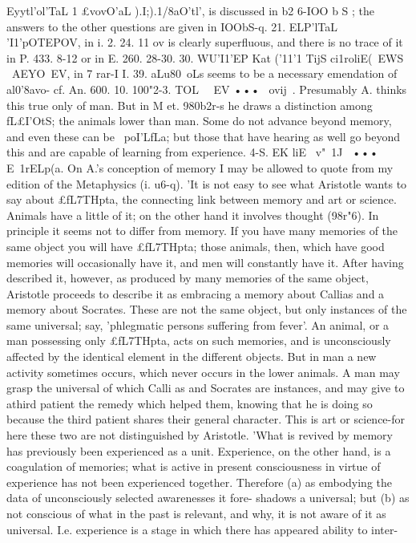 {{{{{{{{{{{{{{{{{{{{{{{{{{{{{{{{{{{{{{{{{{{{{{{{{{{{{{{{{{{{{{{{{{{{{{Eyytl'ol'TaL 1} £vovO'aL ).I;).1/8aO'tl', is discussed in b2 6-IOO b S ; the answers
to the other questions are given in IOObS-q.
21. ELP'lTaL 'I1'pOTEPOV, in i. 2.
24. 11 ov is clearly superfluous, and there is no trace of it in
P. 433. 8-12 or in E. 260. 28-30.
30. WU'I1'EP Kat ('11'1 TijS ci1roliE(~EWS ~AEYO~EV, in 7 rar-I I.
39. aLu80~oLs seems to be a necessary emendation of al0'8avo-
cf. An. 600. 10.
100"2-3. TOL~ ~EV ••• ~ovij~. Presumably A. thinks this true
only of man. But in M et. 980b2r-s he draws a distinction among
fL£I'OtS;
the animals lower than man. Some do not advance beyond
memory, and even these can be ~poI'LfLa; but those that have
hearing as well go beyond this and are capable of learning from
experience.
4-S. EK liE ~v"~1J~ ••• E~1rELp(a. On A.'s conception of memory
I may be allowed to quote from my edition of the Metaphysics
(i. u6-q). 'It is not easy to see what Aristotle wants to say
about £fL7THpta, the connecting link between memory and art or
science. Animals have a little of it; on the other hand it involves
thought (98r"6). In principle it seems not to differ from memory.
If you have many memories of the same object you will have
£fL7THpta; those animals, then, which have good memories will
occasionally have it, and men will constantly have it. After
having described it, however, as produced by many memories
of the same object, Aristotle proceeds to describe it as embracing
a memory about Callias and a memory about Socrates. These
are not the same object, but only instances of the same universal;
say, 'phlegmatic persons suffering from fever'. An animal, or a
man possessing only £fL7THpta, acts on such memories, and is
unconsciously affected by the identical element in the different
objects. But in man a new activity sometimes occurs, which
never occurs in the lower animals. A man may grasp the universal
of which Calli as and Socrates are instances, and may give to athird patient the remedy which helped them, knowing that he is
doing so because the third patient shares their general character.
This is art or science-for here these two are not distinguished
by Aristotle.
'What is revived by memory has previously been experienced
as a unit. Experience, on the other hand, is a coagulation of
memories; what is active in present consciousness in virtue of
experience has not been experienced together. Therefore (a) as
embodying the data of unconsciously selected awarenesses it fore-
shadows a universal; but (b) as not conscious of what in the past
is relevant, and why, it is not aware of it as universal. I.e.
experience is a stage in which there has appeared ability to inter-
}}}}}}}}}}}}}}}}}}}}}}}}}}}}}}}}}}}}}}}}}}}}}}}}}}}}}}}}}}}}}}}}}}}}}
